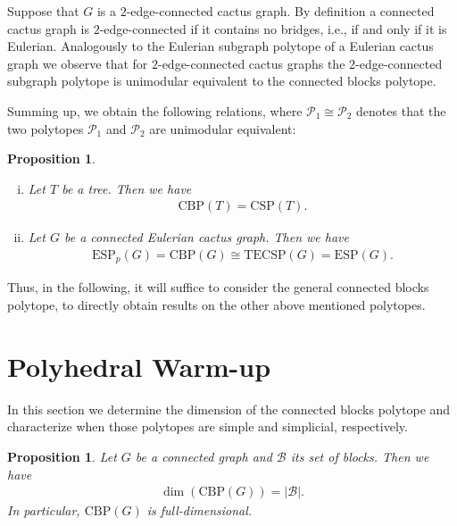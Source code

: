 \documentclass[12pt]{amsart}
\newtheorem{proposition}[theorem]{Proposition}
\newcommand{\ESP}{\mathrm{ESP}}
\newcommand{\CBP}{\mathrm{CBP}}
\newcommand{\CSP}{\mathrm{CSP}}
\newcommand{\TECSP}{\mathrm{TECSP}}
\renewcommand{\P}{\mathcal{P}}
\newcommand{\B}{\mathcal{B}}
\begin{document}
Suppose that $G$ is a $2$-edge-connected cactus graph. By definition a connected cactus graph is $2$-edge-connected if it contains no bridges, i.e., if and only if it is Eulerian. Analogously to the Eulerian subgraph polytope of a Eulerian cactus graph we observe that for $2$-edge-connected cactus graphs the $2$-edge-connected subgraph polytope is unimodular equivalent to the connected blocks polytope.

\bigskip

Summing up, we obtain the following relations, where $\P_1 \cong \P_2$ denotes that the two polytopes $\P_1$ and $\P_2$ are unimodular equivalent:
\begin{proposition}
    \label{proposition connection}
    \begin{enumerate}[(i)]
        \item Let $T$ be a tree. Then we have
            \begin{align*}
                \CBP(T)=\CSP(T).
            \end{align*}
        \item Let $G$ be a connected Eulerian cactus graph. Then we have
            \begin{align*}
                \ESP_p(G)=\CBP(G) \cong \TECSP(G)=\ESP(G).
            \end{align*}
    \end{enumerate}
\end{proposition}

Thus, in the following, it will suffice to consider the general connected blocks polytope, to directly obtain results on the other above mentioned polytopes.

\section{Polyhedral Warm-up}

\label{sectionPolyhedralWarmUp}

In this section we determine the dimension of the connected blocks polytope and characterize when those polytopes are simple and simplicial, respectively.

\begin{proposition}
    \label{dimension}
    Let $G$ be a connected graph and $\B$ its set of blocks. Then we have
    \begin{align*}
        \dim(\CBP(G))=\vert \B \vert.
    \end{align*}
    In particular, $\CBP(G)$ is full-dimensional.
\end{proposition}
\end{document}
